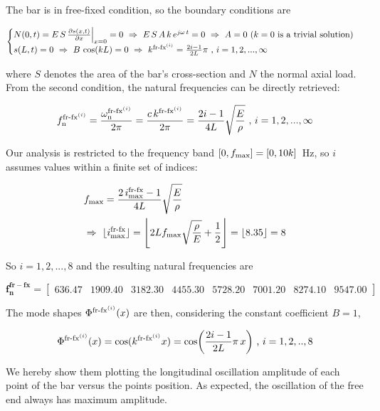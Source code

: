 \documentclass[a4paper,12pt,oneside]{article}
\begin{document}
The bar is in free-fixed condition, so the boundary conditions are

\[ \begin{cases}
	N(0,t) = E \, S \, \frac{\partial s(x,t)}{\partial x} \Big|_{x=0} = 0 %
		~ \Rightarrow ~ E \, S \, A \, k \, e^{j \omega \, t} = 0 %
		~ \Rightarrow ~ A = 0 ~ \text{($ k = 0 $ is a trivial solution)} \\
	s(L,t) = 0 ~ \Rightarrow ~ B \, \cos(kL) = 0 ~ \Rightarrow ~ %
		k^{\textup{fr-fx}^{(i)}} = \frac{2i - 1}{2L} \pi %
		~ \text{,} ~ i = 1,2,...,\infty
\end{cases} \]

where $ S $ denotes the area of the bar's cross-section and $ N $ the normal axial load. From the second condition, the natural frequencies can be directly retrieved:

\[
	f_\textup{n}^{\textup{fr-fx}^{(i)}} = %
		\frac{\omega_\textup{n}^{\textup{fr-fx}^{(i)}}}{2 \pi} = %
		\frac{c \, k^{\textup{fr-fx}^{(i)}}}{2 \pi} = %
		\frac{2i - 1}{4L} \sqrt{\frac{E}{\rho}} ~ \text{,} ~ i = 1,2,...,\infty
\]

Our analysis is restricted to the frequency band $ [0, f_\textup{max}] = [0, 10k] \, $ Hz, so $ i $ assumes values within a finite set of indices:

\[ \begin{split}
	& f_\textup{max} = \frac{2 \, i^\textup{fr-fx}_\textup{max} - 1}{4L} %
		\sqrt{\frac{E}{\rho}} \\
	& \Rightarrow ~ \lfloor i^\textup{fr-fx}_\textup{max} \rfloor = %
		\Biggl\lfloor 2 L f_\textup{max} %
		\sqrt{\frac{\rho}{E}} + \frac{1}{2} \Biggr\rfloor = \lfloor 8.35 \rfloor = 8
\end{split} \]

So $ i = 1,2,...,8 $ and the resulting natural frequencies are

\[
	\mathbf{f_n^{fr-fx}} =	\begin{bmatrix}
														636.47		& 1909.40	& 3182.30	& 4455.30 %
														& 5728.20	& 7001.20	& 8274.10	& 9547.00
													\end{bmatrix}
\]

The mode shapes $ \Phi^{\textup{fr-fx}^{(i)}}(x) $ are then, considering the constant coefficient $ B = 1 $,

\[
	\Phi^{\textup{fr-fx}^{(i)}}(x) = \cos(k^{\textup{fr-fx}^{(i)}} x) =
		\cos\biggl(\frac{2i - 1}{2L} \pi \, x\biggr) ~ \text{,} ~ i = 1,2,..,8
\]

We hereby show them plotting the longitudinal oscillation amplitude of each point of the bar versus the points position. As expected, the oscillation of the free end always has maximum amplitude.
\end{document}
